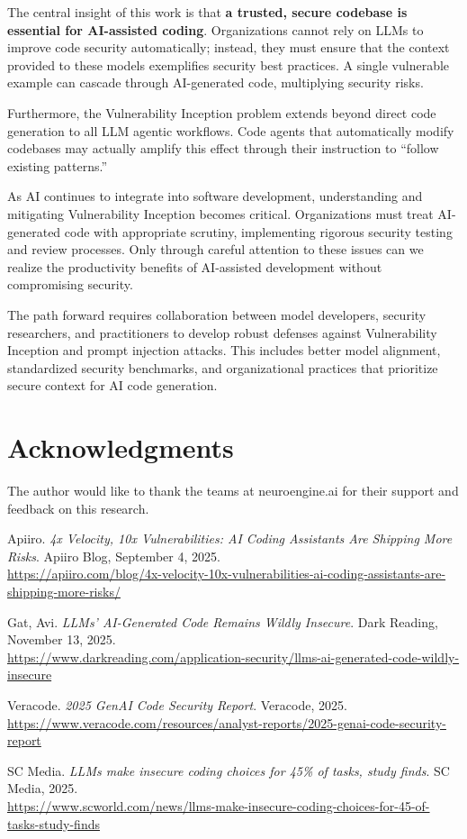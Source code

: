 \documentclass[11pt,a4paper]{article}
\begin{document}
The central insight of this work is that \textbf{a trusted, secure codebase is essential for AI-assisted coding}. Organizations cannot rely on LLMs to improve code security automatically; instead, they must ensure that the context provided to these models exemplifies security best practices. A single vulnerable example can cascade through AI-generated code, multiplying security risks.

Furthermore, the Vulnerability Inception problem extends beyond direct code generation to all LLM agentic workflows. Code agents that automatically modify codebases may actually amplify this effect through their instruction to ``follow existing patterns.''

As AI continues to integrate into software development, understanding and mitigating Vulnerability Inception becomes critical. Organizations must treat AI-generated code with appropriate scrutiny, implementing rigorous security testing and review processes. Only through careful attention to these issues can we realize the productivity benefits of AI-assisted development without compromising security.

The path forward requires collaboration between model developers, security researchers, and practitioners to develop robust defenses against Vulnerability Inception and prompt injection attacks. This includes better model alignment, standardized security benchmarks, and organizational practices that prioritize secure context for AI code generation.

\section*{Acknowledgments}

The author would like to thank the teams at neuroengine.ai for their support and feedback on this research.

\begin{thebibliography}{9}
Apiiro.
\textit{4x Velocity, 10x Vulnerabilities: AI Coding Assistants Are Shipping More Risks}.
Apiiro Blog, September 4, 2025.
\\\url{https://apiiro.com/blog/4x-velocity-10x-vulnerabilities-ai-coding-assistants-are-shipping-more-risks/}

Gat, Avi.
\textit{LLMs' AI-Generated Code Remains Wildly Insecure}.
Dark Reading, November 13, 2025.
\\\url{https://www.darkreading.com/application-security/llms-ai-generated-code-wildly-insecure}

Veracode.
\textit{2025 GenAI Code Security Report}.
Veracode, 2025.
\\\url{https://www.veracode.com/resources/analyst-reports/2025-genai-code-security-report}

SC Media.
\textit{LLMs make insecure coding choices for 45\% of tasks, study finds}.
SC Media, 2025.
\\\url{https://www.scworld.com/news/llms-make-insecure-coding-choices-for-45-of-tasks-study-finds}
\end{thebibliography}
\end{document}
